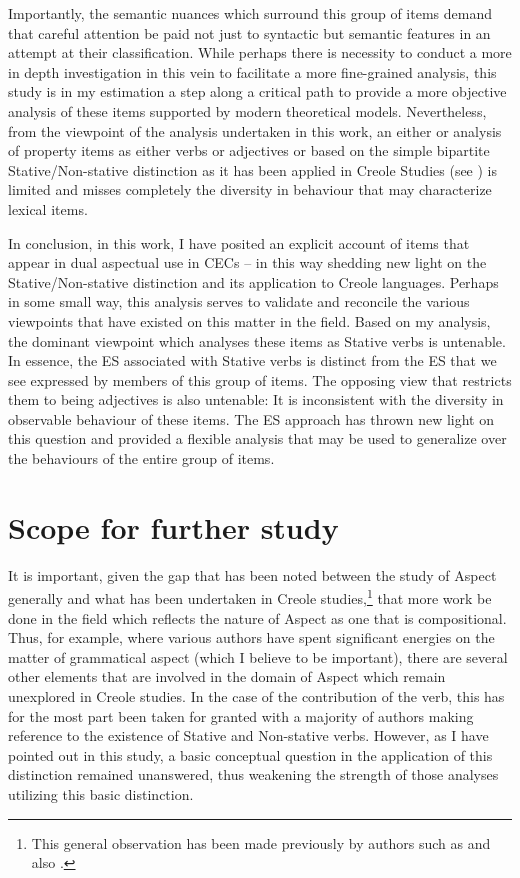 Importantly, the semantic nuances which surround this group of items demand that careful attention be paid not just to syntactic but semantic features in an attempt at their classification. While perhaps there is necessity to conduct a more in depth investigation in this vein to facilitate a more fine-grained analysis, this study is in my estimation a step along a critical path to provide a more objective analysis of these items supported by modern theoretical models. Nevertheless, from the viewpoint of the analysis undertaken in this work, an either or analysis of property items as either verbs or adjectives or based on the simple bipartite Stative\slash Non-stative distinction as it has been applied in Creole Studies (see \citealt{Bickerton1975,Bickerton1981}) is limited and misses completely the diversity in behaviour that may characterize lexical items. 

In conclusion, in this work, I have posited an explicit account of items that appear in dual aspectual use in CECs -- in this way shedding new light on the Stative\slash Non-stative distinction and its application to Creole languages. Perhaps in some small way, this analysis serves to validate and reconcile the various viewpoints that have existed on this matter in the field. Based on my analysis, the dominant viewpoint which analyses these items as Stative verbs is untenable. In essence, the ES associated with Stative verbs is distinct from the ES that we see expressed by members of this group of items. The opposing view that restricts them to being adjectives is also untenable: It is inconsistent with the diversity in observable behaviour of these items. The ES approach has thrown new light on this question and provided a flexible analysis that may be used to generalize over the behaviours of the entire group of items. 


\section{Scope for further study}\label{sec:6.3}

It is important, given the gap that has been noted between the study of Aspect generally and what has been undertaken in Creole studies,\footnote{This general observation has been made previously by authors such as \citet{Winford1993,Winford1997,Winford2001} and also \citet{Dahl1993}.} that more work be done in the field which reflects the nature of Aspect as one that is compositional. Thus, for example, where various authors have spent significant energies on the matter of grammatical aspect (which I believe to be important), there are several other elements that are involved in the domain of Aspect which remain unexplored in Creole studies. In the case of the contribution of the verb, this has for the most part been taken for granted with a majority of authors making reference to the existence of Stative and Non-stative verbs. However, as I have pointed out in this study, a basic conceptual question in the application of this distinction remained unanswered, thus weakening the strength of those analyses utilizing this basic distinction. 

